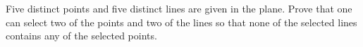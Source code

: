Five distinct points and five distinct lines are given in the plane. Prove that one can select two of the points and two of the lines so that none of the selected lines contains any of the selected points.